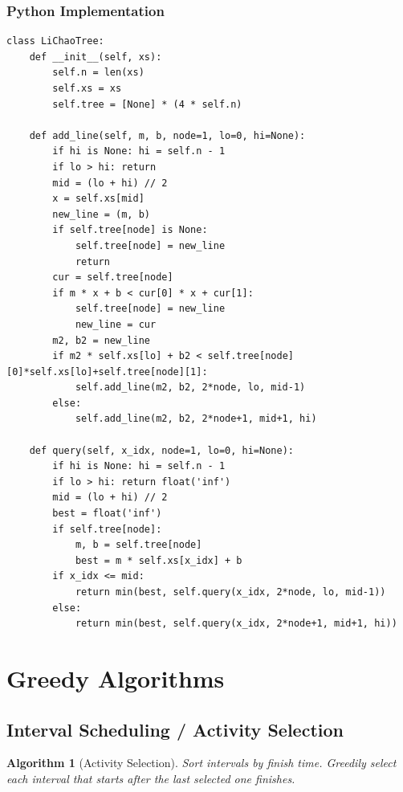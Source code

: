 \documentclass[10pt,a4paper]{article}
\theoremstyle{cpstyle}
\newtheorem{algorithm}[theorem]{Algorithm}
\begin{document}
\subsubsection{Python Implementation}
\begin{lstlisting}[caption={Convex Hull Trick (Li Chao tree variant)}]
class LiChaoTree:
    def __init__(self, xs):
        self.n = len(xs)
        self.xs = xs
        self.tree = [None] * (4 * self.n)

    def add_line(self, m, b, node=1, lo=0, hi=None):
        if hi is None: hi = self.n - 1
        if lo > hi: return
        mid = (lo + hi) // 2
        x = self.xs[mid]
        new_line = (m, b)
        if self.tree[node] is None:
            self.tree[node] = new_line
            return
        cur = self.tree[node]
        if m * x + b < cur[0] * x + cur[1]:
            self.tree[node] = new_line
            new_line = cur
        m2, b2 = new_line
        if m2 * self.xs[lo] + b2 < self.tree[node][0]*self.xs[lo]+self.tree[node][1]:
            self.add_line(m2, b2, 2*node, lo, mid-1)
        else:
            self.add_line(m2, b2, 2*node+1, mid+1, hi)

    def query(self, x_idx, node=1, lo=0, hi=None):
        if hi is None: hi = self.n - 1
        if lo > hi: return float('inf')
        mid = (lo + hi) // 2
        best = float('inf')
        if self.tree[node]:
            m, b = self.tree[node]
            best = m * self.xs[x_idx] + b
        if x_idx <= mid:
            return min(best, self.query(x_idx, 2*node, lo, mid-1))
        else:
            return min(best, self.query(x_idx, 2*node+1, mid+1, hi))
\end{lstlisting}

\clearpage
\section{Greedy Algorithms}

\subsection{Interval Scheduling / Activity Selection}

\begin{algorithm}[Activity Selection]
Sort intervals by finish time. Greedily select each interval that starts after the last selected one finishes.
\end{algorithm}
\end{document}
